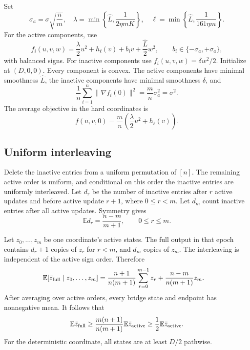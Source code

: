\documentclass[twoside]{article}
\newcommand{\E}{\mathbb E}
\begin{document}
Set
\begin{equation}
 \sigma_a=\sigma\sqrt{\frac nm},
 \quad
 \lambda=\min\left\{\widehat L,\frac1{2\eta mK}\right\},
 \quad
 \ell=\min\left\{\widehat L,\frac1{161\eta m}\right\}.            \label{eq:app-hetero-scales}
\end{equation}
For the active components, use
\begin{equation}
 f_i(u,v,w)=\frac\lambda2u^2+h_\ell(v)+b_iv
 +\frac{\widehat L}{2}w^2,
 \qquad b_i\in\{-\sigma_a,+\sigma_a\},              \label{eq:app-active}
\end{equation}
with balanced signs. For inactive components use
$f_i(u,v,w)=\delta w^2/2$. Initialize at $(D,0,0)$. Every component is convex.
The active components have minimal smoothness $\widehat L$, the inactive
components have minimal smoothness $\delta$, and
\begin{equation}
 \frac1n\sum_{i=1}^n\|\nabla f_i(0)\|^2
 =\frac mn\sigma_a^2=\sigma^2.                    \label{eq:app-hetero-variance}
\end{equation}
The average objective in the hard coordinates is
\begin{equation}
 f(u,v,0)=\frac mn\left(\frac\lambda2u^2+h_\ell(v)\right).
 \label{eq:app-hetero-objective}
\end{equation}

\subsection{Uniform interleaving}

Delete the inactive entries from a uniform permutation of $[n]$. The remaining
active order is uniform, and conditional on this order the inactive entries
are uniformly interleaved. Let $d_r$ be the number of inactive entries after
$r$ active updates and before active update $r+1$, where $0\le r<m$. Let
$d_m$ count inactive entries after all active updates. Symmetry gives
\begin{equation}
 \E d_r=\frac{n-m}{m+1},
 \qquad 0\le r\le m.                                \label{eq:app-gap}
\end{equation}

Let $z_0,\ldots,z_m$ be one coordinate's active states. The full output in
that epoch contains $d_r+1$ copies of $z_r$ for $r<m$, and $d_m$ copies of
$z_m$. The interleaving is independent of the active sign order. Therefore
\begin{align}
 \E[\bar z_{\rm full}\mid z_0,\ldots,z_m]
 &=\frac{n+1}{n(m+1)}\sum_{r=0}^{m-1}z_r
 +\frac{n-m}{n(m+1)}z_m.                           \label{eq:app-interleave}
\end{align}
After averaging over active orders, every bridge state and endpoint has
nonnegative mean. It follows that
\begin{equation}
 \E\bar z_{\rm full}
 \ge\frac{m(n+1)}{n(m+1)}
 \E\bar z_{\rm active}
 \ge\frac12\E\bar z_{\rm active}.                  \label{eq:app-interleave-lower}
\end{equation}
For the deterministic coordinate, all states are at least $D/2$ pathwise.
\end{document}
